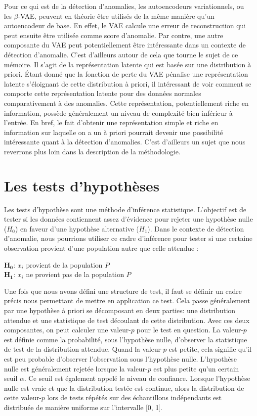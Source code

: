 Pour ce qui est de la détection d'anomalies, les autoencodeurs variationnels, ou les $\beta$-VAE, peuvent en théorie être utilisés de la même manière qu'un autoencodeur de base. En effet, le VAE calcule une erreur de reconstruction qui peut ensuite être utilisée comme score d'anomalie. Par contre, une autre composante du VAE peut potentiellement être intéressante dans un contexte de détection d'anomalie. C'est d'ailleurs autour de cela que tourne le sujet de ce mémoire. Il s'agit de la représentation latente qui est basée sur une distribution à priori. Étant donné que la fonction de perte du VAE pénalise une représentation latente s'éloignant de cette distribution à priori, il intéressant de voir comment se comporte cette représentation latente pour des données normales comparativement à des anomalies. Cette représentation, potentiellement riche en information, possède généralement un niveau de complexité bien inférieur à l'entrée. En bref, le fait d'obtenir une représentation simple et riche en information sur laquelle on a un à priori pourrait devenir une possibilité intéressante quant à la détection d'anomalies. C'est d'ailleurs un sujet que nous reverrons plus loin dans la description de la méthodologie.


\section{Les tests d'hypothèses}

Les tests d'hypothèse sont une méthode d'inférence statistique. L'objectif est de tester si les données contiennent assez d'évidence pour rejeter une hypothèse nulle ($H_0$) en faveur d'une hypothèse alternative ($H_1$). Dans le contexte de détection d'anomalie, nous pourrions utiliser ce cadre d'inférence pour tester si une certaine observation provient d'une population autre que celle attendue : \newline

\noindent $\boldsymbol{H_0}$: $x_i$ provient de la population $P$ \\
$\boldsymbol{H_1}$: $x_i$ ne provient pas de la population $P$
\newline

\noindent Une fois que nous avons défini une structure de test, il faut se définir un cadre précis nous permettant de mettre en application ce test. Cela passe généralement par une hypothèse à priori se décomposant en deux parties: une distribution attendue et une statistique de test découlant de cette distribution. Avec ces deux composantes, on peut calculer une valeur-$p$ pour le test en question. La valeur-$p$ est définie comme la probabilité, sous l'hypothèse nulle, d'observer la statistique de test de la distribution attendue. Quand la valeur-$p$ est petite, cela signifie qu'il est peu probable d'observer l'observation sous l'hypothèse nulle. L'hypothèse nulle est généralement rejetée lorsque la valeur-$p$ est plus petite qu'un certain seuil $\alpha$. Ce seuil est également appelé le niveau de confiance. Lorsque l'hypothèse nulle est vraie et que la distribution testée est continue, alors la distribution de cette valeur-$p$ lors de tests répétés sur des échantillons indépendants est distribuée de manière uniforme sur l'intervalle [0, 1]. 

